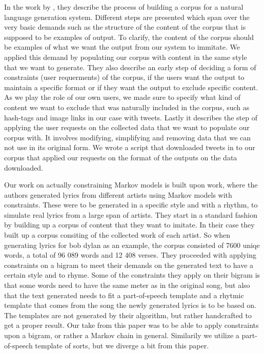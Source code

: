 \documentclass[a4paper,12pt]{article}
\begin{document}
In the work by \cite{Corpus}, they describe the process of building a corpus for a natural language generation system. 
Different steps are presented which span over the very basic demands such as the structure of the content of the corpus that is supposed to be examples of output. 
To clarify, the content of the corpus should be examples of what we want the output from our system to immitate. 
We applied this demand by populating our corpus with content in the same style that we want to generate. %
They also describe an early step of deciding a form of constraints (user requerments) of the corpus, 
if the users want the output to maintain a specific format or if they want the output to exclude specific content.
As we play the role of our own users, we made sure to specify what kind of content we want to exclude that was naturally included in the corpus, 
such as hash-tags and image links in our case with tweets. %
Lastly it describes the step of applying the user requests on the collected data that we want to populate our corpus with.
It involves modifying, simplifying and removing data that we can not use in its original form.
We wrote a script that downloaded tweets in to our corpus that applied our requests on the format of the outputs on the data downloaded.
% 

Our work on actually constraining Markov models is built upon \cite{McBarb} work, 
where the authors generated lyrics from different artists using Markov models with constraints. 
These were to be generated in a specific style and with a rhythm, to simulate real lyrics from a large span of artists.
They start in a standard fashion by building up a corpus of content that they want to imitate. 
In their case they built up a corpus consiting of the collected work of each artist. 
So when generating lyrics for bob dylan as an example, the corpus consisted of 7600 uniqe words, a total of 96 089 words and 12 408 verses.
They proceeded with applying constraints on a bigram to meet their demands on the generated text to have a certain style and to rhyme.
Some of the constraints they apply on their bigram is that some words need to have the same meter as in the original song, but also that the text generated
needs to fit a part-of-speech template and a rhytmic template that comes from the song the newly generated lyrics is to be based on. 
The templates are not generated by their algorithm, but rather handcrafted to get a proper result. Our take from this paper was to be able to apply constraints
upon a bigram, or rather a Markov chain in general. Similarily we utilize a part-of-speech template of sorts, but we diverge a bit from this paper.
\end{document}
